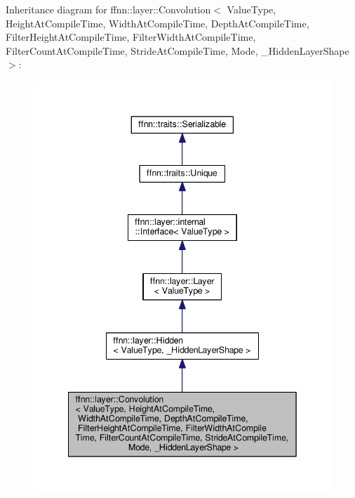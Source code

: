 Inheritance diagram for ffnn\-:\-:layer\-:\-:Convolution$<$ Value\-Type, Height\-At\-Compile\-Time, Width\-At\-Compile\-Time, Depth\-At\-Compile\-Time, Filter\-Height\-At\-Compile\-Time, Filter\-Width\-At\-Compile\-Time, Filter\-Count\-At\-Compile\-Time, Stride\-At\-Compile\-Time, Mode, \-\_\-\-Hidden\-Layer\-Shape $>$\-:\nopagebreak
\begin{figure}[H]
\begin{center}
\leavevmode
\includegraphics[width=342pt]{classffnn_1_1layer_1_1_convolution__inherit__graph}
\end{center}
\end{figure}


